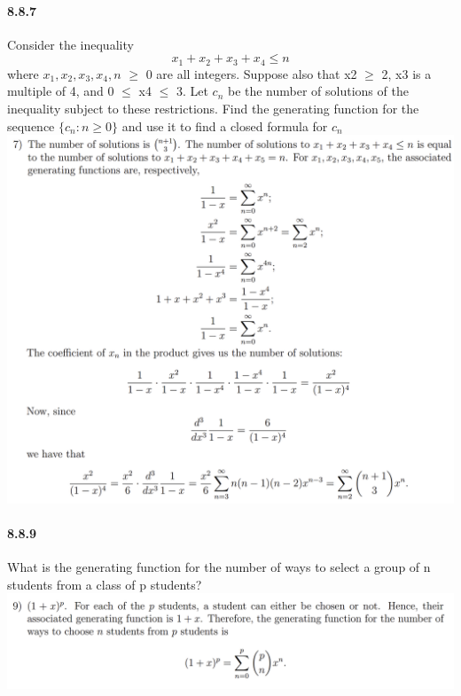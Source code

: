 \documentclass{article}
\begin{document}
\paragraph{8.8.7}
Consider the inequality $$x_1+x_2+x_3+x_4\leq n$$
where $x_1, x_2, x_3, x_4, n$ $\ge$ 0 are all integers. Suppose also that x2 $\ge$ 2, x3 is a multiple of
4, and 0 $\leq$ x4 $\leq$ 3. Let $c_n$ be the number of solutions of the inequality subject to these
restrictions. Find the generating function for the sequence $\{c_n:n\ge 0\}$ and use it to
find a closed formula for $c_n$\newline
\includegraphics{0016}
\paragraph{8.8.9}
What is the generating function for the number of ways to select a group of n students from a class of p students?\newline
\includegraphics{0017}
\end{document}

